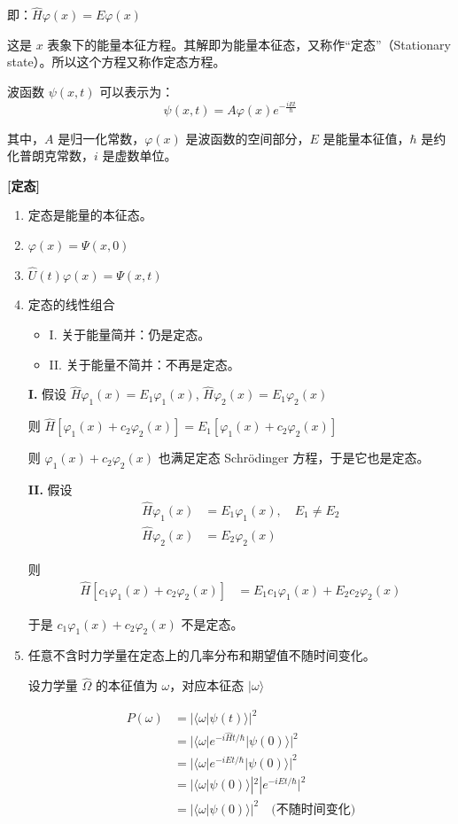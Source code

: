 \documentclass[lang=cn,10pt]{elegantbook}
\begin{document}
即：\(\hat{H} \varphi(x) = E \varphi(x)\)

这是 \(x\) 表象下的能量本征方程。其解即为能量本征态，又称作“定态”（Stationary state）。所以这个方程又称作定态方程。

波函数 \(\psi(x, t)\) 可以表示为：
\[ \psi(x, t) = A \varphi(x) e^{-\frac{iEt}{\hbar}} \]

其中，\(A\) 是归一化常数，\(\varphi(x)\) 是波函数的空间部分，\(E\) 是能量本征值，\(\hbar\) 是约化普朗克常数，\(i\) 是虚数单位。

\textbf{[定态]}
\begin{enumerate}
	\item 定态是能量的本征态。
	\item \(\varphi(x) = \Psi(x, 0)\)
	\item \(\hat{U}(t) \varphi(x) = \Psi(x, t)\)
	\item 定态的线性组合
	\begin{itemize}
		\item I. 关于能量简并：仍是定态。
		\item II. 关于能量不简并：不再是定态。
	\end{itemize}




	\textbf{I.} 假设 \(\hat{H} \varphi_1(x) = E_1 \varphi_1(x)\), \(\hat{H} \varphi_2(x) = E_1 \varphi_2(x)\)

	则 \(\hat{H} [\varphi_1(x) + c_2 \varphi_2(x)] = E_1 [\varphi_1(x) + c_2 \varphi_2(x)]\)

	则 \(\varphi_1(x) + c_2\varphi_2(x)\) 也满足定态 Schrödinger 方程，于是它也是定态。

\textbf{II.} 假设
\begin{align*}
	\hat{H} \varphi_1(x) &= E_1 \varphi_1(x), \quad E_1 \neq E_2 \\
	\hat{H} \varphi_2(x) &= E_2 \varphi_2(x)
\end{align*}

则
\begin{align*}
	\hat{H} [c_1 \varphi_1(x) + c_2 \varphi_2(x)] &= E_1 c_1 \varphi_1(x) + E_2 c_2 \varphi_2(x)
\end{align*}

于是 \(c_1 \varphi_1(x) + c_2 \varphi_2(x)\) 不是定态。

	\item 任意不含时力学量在定态上的几率分布和期望值不随时间变化。
	
	设力学量 $\hat{\Omega}$ 的本征值为 $\omega$，对应本征态 $|\omega\rangle$
	
	\begin{align*}
		P(\omega) &= |\langle \omega | \psi(t) \rangle|^2 \\
		&= |\langle \omega | e^{-i\hat{H}t/\hbar} | \psi(0) \rangle|^2 \\
		&= |\langle \omega | e^{-iEt/\hbar} | \psi(0) \rangle|^2 \\
		&= |\langle \omega | \psi(0) \rangle|^2 |e^{-iEt/\hbar}|^2 \\
		&= |\langle \omega | \psi(0) \rangle|^2 \quad \text{(不随时间变化)}
	\end{align*}
	

\end{enumerate}
\end{document}
